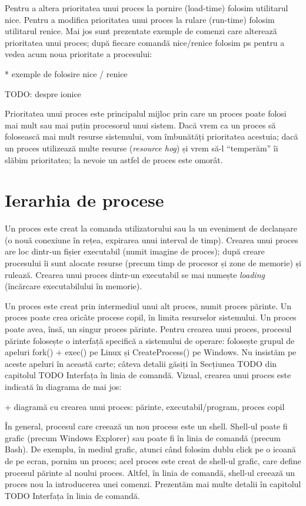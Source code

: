 Pentru a altera prioritatea unui proces la pornire (load-time) folosim
utilitarul nice. Pentru a modifica prioritatea unui proces la rulare (run-time)
folosim utilitarul renice. Mai jos sunt prezentate exemple de comenzi care
alterează prioritatea unui proces; după fiecare comandă nice/renice folosim ps
pentru a vedea acum noua prioritate a procesului:

* exemple de folosire nice / renice

TODO: despre ionice

Prioritatea unui proces este principalul mijloc prin care un proces poate folosi
mai mult sau mai puțin procesorul unui sistem. Dacă vrem ca un proces să
folosească mai mult resurse sistemului, vom îmbunătăți prioritatea acestuia;
dacă un proces utilizează multe resurse (\textit{resource hog}) și vrem să-l
“temperăm” îi slăbim prioritatea; la nevoie un astfel de proces este omorât.

\section{Ierarhia de procese}
\label{sec:procese-ierarhie}

Un proces este creat la comanda utilizatorului sau la un eveniment de declanșare
(o nouă conexiune în rețea, expirarea unui interval de timp). Crearea unui
proces are loc dintr-un fișier executabil (numit imagine de proces); după creare
procesului îi sunt alocate resurse (precum timp de procesor și zone de memorie)
și rulează. Crearea unui proces dintr-un executabil se mai numește
\textit{loading} (încărcare executabilului în memorie).

Un proces este creat prin intermediul unui alt proces, numit proces părinte. Un
proces poate crea oricâte procese copil, în limita resurselor sistemului. Un
proces poate avea, însă, un singur proces părinte. Pentru crearea unui proces,
procesul părinte folosește o interfață specifică a sistemului de operare:
folosește grupul de apeluri fork() + exec() pe Linux și CreateProcess() pe
Windows. Nu insistăm pe aceste apeluri în această carte; câteva detalii găsiți
în Secțiunea TODO din capitolul TODO Interfața în linia de comandă. Vizual,
crearea unui proces este indicată în diagrama de mai jos:

+     diagramă cu crearea unui proces: părinte, executabil/program, proces copil

În general, procesul care creează un nou process este un shell. Shell-ul poate
fi grafic (precum Windows Explorer) sau poate fi în linia de comandă (precum
Bash). De exemplu, în mediul grafic, atunci când folosim dublu click pe o icoană
de pe ecran, pornim un proces; acel proces este creat de shell-ul grafic, care
define procesul părinte al noului proces. Altfel, în linia de comandă, shell-ul
creează un proces nou la introducerea unei comenzi. Prezentăm mai multe detalii
în capitolul TODO Interfața în linia de comandă.

